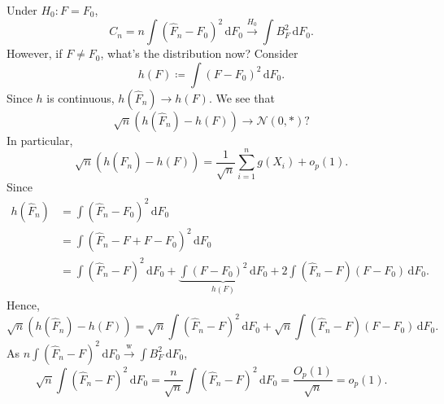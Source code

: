 Under \(H_0 \colon F = F_0\),
\[
	C_n = n \int (\hat{F} _n - F_0)^2 \,\mathrm{d} F_0
	\overset{H_0}{\to } \int B_F^2 \,\mathrm{d} F_0.
\]
However, if \(F \neq F_0\), what's the distribution now? Consider
\[
	h(F) \coloneqq \int (F - F_0)^2 \,\mathrm{d} F_0.
\]
Since \(h\) is continuous, \(h(\hat{F} _n) \to h(F) \). We see that
\[
	\sqrt{n} \left( h(\hat{F} _n) - h(F) \right)
	\to \mathcal{N} (0, \ast)?
\]
In particular,
\[
	\sqrt{n} \left( h(\hat{F} _n) - h(F) \right)
	= \frac{1}{\sqrt{n} } \sum_{i=1}^{n} g(X_i) + o_p(1).
\]
Since
\[
	\begin{split}
		h(\hat{F} _n)
		 & = \int (\hat{F} _n - F_0)^2 \,\mathrm{d} F_0                                                                                                             \\
		 & = \int (\hat{F} _n - F + F - F_0)^2 \,\mathrm{d} F_0                                                                                                     \\
		 & = \int (\hat{F} _n - F)^2 \,\mathrm{d} F_0 + \underbrace{\int (F - F_0)^2 \,\mathrm{d} F_0}_{h(F)} + 2 \int (\hat{F} _n - F) (F - F_0) \,\mathrm{d} F_0.
	\end{split}
\]
Hence,
\[
	\sqrt{n} \left( h(\hat{F} _n) - h(F) \right)
	= \sqrt{n} \int (\hat{F} _n - F)^2 \,\mathrm{d} F_0 + \sqrt{n} \int (\hat{F} _n - F) (F - F_0) \,\mathrm{d} F_0.
\]
As \(n \int (\hat{F} _n - F)^2 \,\mathrm{d} F_0 \overset{\text{w} }{\to} \int B_F^2 \,\mathrm{d} F_0\),
\[
	\sqrt{n} \int (\hat{F} _n - F)^2 \,\mathrm{d} F_0
	= \frac{n}{\sqrt{n} } \int (\hat{F} _n - F)^2 \,\mathrm{d} F_0
	= \frac{O_p(1)}{\sqrt{n} }
	= o_p(1).
\]
